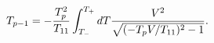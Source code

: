 \begin{equation}
T_{p-1}= -\frac{T_{p}^{2}}{T_{11}}
\int_{T_{-}}^{T_{+}}dT\frac{V^{2}}{\sqrt{(-T_{p}V/T_{11})^{2}-1}}.
\label{tto} \\
\end{equation}


